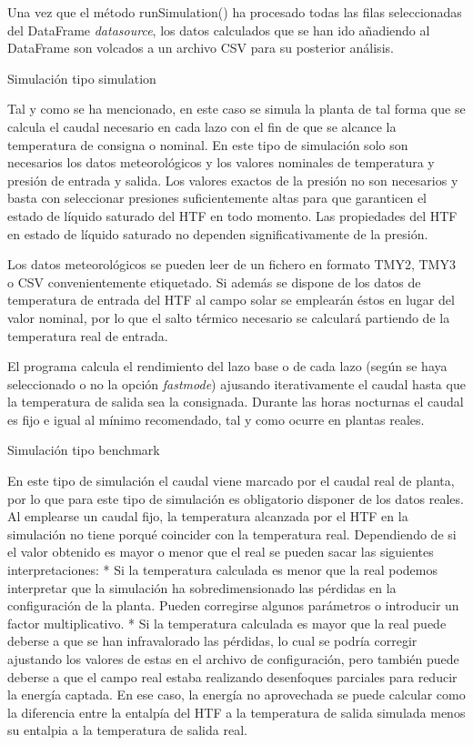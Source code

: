 Una vez que el método runSimulation() ha procesado todas las filas seleccionadas del DataFrame \emph{datasource}, los datos calculados que se han ido añadiendo al DataFrame son volcados a un archivo CSV para su posterior análisis.

\hypertarget{simulaciuxf3n-tipo-simulation}{Simulación tipo simulation}

Tal y como se ha mencionado, en este caso se simula la planta de tal forma que se calcula el caudal necesario en cada lazo con el fin de que se alcance la temperatura de consigna o nominal. En este tipo de simulación solo son necesarios los datos meteorológicos y los valores nominales de temperatura y presión de entrada y salida. Los valores exactos de la presión no son necesarios y basta con seleccionar presiones suficientemente altas para que garanticen el estado de líquido
saturado del HTF en todo momento. Las propiedades del HTF en estado de líquido saturado no dependen significativamente de la presión.

Los datos meteorológicos se pueden leer de un fichero en formato TMY2, TMY3 o CSV convenientemente etiquetado. Si además se dispone de los datos de temperatura de entrada del HTF al campo solar se emplearán éstos en lugar del valor nominal, por lo que el salto térmico necesario se calculará partiendo de la temperatura real de entrada.

El programa calcula el rendimiento del lazo base o de cada lazo (según se haya seleccionado o no la opción \emph{fastmode}) ajusando iterativamente el caudal hasta que la temperatura de salida sea la consignada. Durante las horas nocturnas el caudal es fijo e igual al mínimo recomendado, tal y como ocurre en plantas reales. 

\hypertarget{simulaciuxf3n-tipo-benchmark}{Simulación tipo benchmark}

En este tipo de simulación el caudal viene marcado por el caudal real de planta, por lo que para este tipo de simulación es obligatorio disponer de los datos reales. Al emplearse un caudal fijo, la temperatura alcanzada por el HTF en la simulación no tiene porqué coincider con la temperatura real. Dependiendo de si el valor obtenido es mayor o menor que el real se pueden sacar las siguientes interpretaciones: 
* Si la  temperatura calculada es menor que la real podemos interpretar que la simulación ha sobredimensionado las pérdidas en la configuración de la planta. Pueden corregirse algunos parámetros o introducir un factor multiplicativo. 
* Si la temperatura calculada es mayor que la real puede deberse a que se han infravalorado las pérdidas, lo cual se podría corregir ajustando los valores de estas en el archivo de configuración, pero también puede deberse a que el campo real estaba realizando desenfoques parciales para reducir la energía captada. En ese caso, la energía no aprovechada se puede calcular como la diferencia entre la entalpía del HTF a la temperatura de salida simulada menos su entalpia a la temperatura de salida real.

